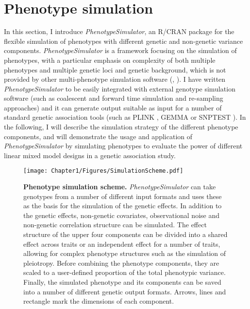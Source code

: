 \newpage
\section{Phenotype simulation}
\label{section:phenotype-simulation}
In this section, I introduce \textit{PhenotypeSimulator}, an R/CRAN package for the flexible simulation of phenotypes with different genetic and non-genetic variance components. \textit{PhenotypeSimulator} is a framework focusing on the simulation of phenotypes, with a particular emphasis on complexity of both multiple phenotypes and multiple genetic loci and genetic background, which is not provided by other multi-phenotype simulation software (\citep{OReilly2012}, \citep{Porter2017}).  I have written \textit{PhenotypeSimulator} to be easily integrated with external genotype simulation software (such as coalescent and forward time simulation and re-sampling approaches) and it can generate output suitable as input for a number of standard genetic association tools (such as PLINK \citep{Chang2015}, GEMMA \citep{Zhou2014} or SNPTEST \citep{Marchini2007}). In the following, I will describe the simulation strategy of the different phenotype components, and will demonstrate the usage and application of \textit{PhenotypeSimulator} by simulating phenotypes to evaluate the power of different linear mixed model designs in a genetic association study.
%
\begin{figure*}[hbtp]
	\centering
	\texttt{[image: Chapter1/Figures/SimulationScheme.pdf]}
	\caption[\textbf{Phenotype simulation scheme.}]{\textbf{Phenotype simulation scheme.} \textit{PhenotypeSimulator} can take genotypes from a number of different input formats and uses these as the basis for the simulation of the genetic effects. In addition to the genetic effects, non-genetic covariates, observational noise and non-genetic correlation structure can be simulated. The effect structure of the upper four components can be divided into a shared effect across traits or an independent effect for a number of traits, allowing for complex phenotype structures such as the simulation of pleiotropy. Before combining the phenotype components, they are scaled to a user-defined proportion of the total phenotypic variance. Finally, the simulated phenotype and its components can be saved into a number of different genetic output formats. Arrows, lines and rectangle mark the dimensions of each component.} 
	 	\label{fig:simulation-scheme}
\end{figure*}


